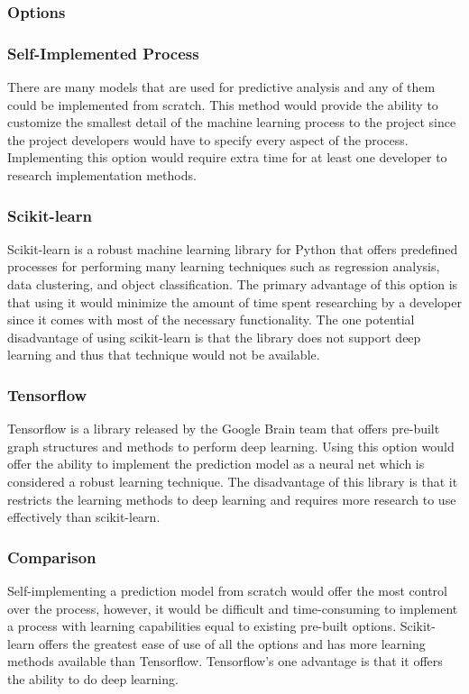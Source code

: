 \documentclass[onecolumn, draftclsnofoot,10pt, compsoc]{IEEEtran}
\begin{document}
	\subsubsection{Options}
	\subsubsection{Self-Implemented Process}
	There are many models that are used for predictive analysis and any of them could be implemented from scratch.
	This method would provide the ability to customize the smallest detail of the machine learning process to the project since the project developers would have to specify every aspect of the process.
	Implementing this option would require extra time for at least one developer to research implementation methods.
	\subsubsection{Scikit-learn}
	Scikit-learn is a robust machine learning library for Python that offers predefined processes for performing many learning techniques such as regression analysis, data clustering, and object classification\cite{ScikitLearnOrg}.
	The primary advantage of this option is that using it would minimize the amount of time spent researching by a developer since it comes with most of the necessary functionality.
	The one potential disadvantage of using scikit-learn is that the library does not support deep learning and thus that technique would not be available\cite{ScikitLearnDeepLearning}.
	\subsubsection{Tensorflow}
	Tensorflow is a library released by the Google Brain team that offers pre-built graph structures and methods to perform deep learning\cite{TensorflowOrg}.
	Using this option would offer the ability to implement the prediction model as a neural net which is considered a robust learning technique.
	The disadvantage of this library is that it restricts the learning methods to deep learning and requires more research to use effectively than scikit-learn.
	\subsubsection{Comparison}
	Self-implementing a prediction model from scratch would offer the most control over the process, however, it would be difficult and time-consuming to implement a process with learning capabilities equal to existing pre-built options.
	Scikit-learn offers the greatest ease of use of all the options and has more learning methods available than Tensorflow.
	Tensorflow's one advantage is that it offers the ability to do deep learning.
\end{document}
